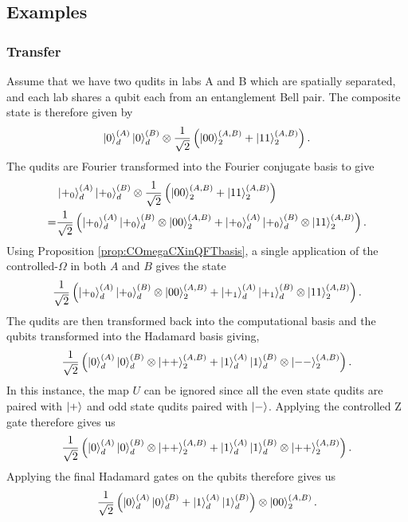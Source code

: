 \subsection{Examples}
\label{subsection:examples}
\subsubsection{Transfer}
\label{subsubsection:aqcstorage}
Assume that we have two qudits in labs A and B which are spatially separated, and each lab shares a qubit each from an entanglement Bell pair. The composite state is therefore given by
\begin{equation}
    \ket{0}^{(A)}_d\ket{0}^{(B)}_d\otimes\frac{1}{\sqrt{2}}\left(\ket{00}_2^{(A,B)} + \ket{11}_2^{(A,B)}\right).
\end{equation}
The qudits are Fourier transformed into the Fourier conjugate basis to give
\begin{align}
    &\ket{+_0}^{(A)}_d\ket{+_0}^{(B)}_d\otimes\frac{1}{\sqrt{2}}\left(\ket{00}_2^{(A,B)} + \ket{11}_2^{(A,B)}\right)\\
    =&\frac{1}{\sqrt{2}}\left(
        \ket{+_0}^{(A)}_d\ket{+_0}^{(B)}_d \otimes \ket{00}_2^{(A,B)}
        +\ket{+_0}^{(A)}_d\ket{+_0}^{(B)}_d \otimes \ket{11}_2^{(A,B)}
        \right).
\end{align}
Using Proposition \ref{prop:COmegaCXinQFTbasis}, a single application of the controlled-$\Omega$ in both $A$ and $B$ gives the state
\begin{equation}
    \frac{1}{\sqrt{2}}\left(
        \ket{+_0}^{(A)}_d\ket{+_0}^{(B)}_d \otimes \ket{00}_2^{(A,B)}
        +\ket{+_1}^{(A)}_d\ket{+_1}^{(B)}_d \otimes \ket{11}_2^{(A,B)}
        \right).
\end{equation}
The qudits are then transformed back into the computational basis and the qubits transformed into the Hadamard basis giving,
\begin{equation}
    \frac{1}{\sqrt{2}}\left(
        \ket{0}^{(A)}_d\ket{0}^{(B)}_d \otimes \ket{++}_2^{(A,B)}
        +\ket{1}^{(A)}_d\ket{1}^{(B)}_d \otimes \ket{--}_2^{(A,B)}
        \right).
\end{equation}
In this instance, the map $U$ can be ignored since all the even state qudits are paired with $\ket{+}$ and odd state qudits paired with $\ket{-}$. Applying the controlled Z gate therefore gives us
\begin{equation}
    \frac{1}{\sqrt{2}}\left(
        \ket{0}^{(A)}_d\ket{0}^{(B)}_d \otimes \ket{++}_2^{(A,B)}
        +\ket{1}^{(A)}_d\ket{1}^{(B)}_d \otimes \ket{++}_2^{(A,B)}
        \right).
\end{equation}
Applying the final Hadamard gates on the qubits therefore gives us
\begin{equation}
    \label{eq:singletransferfinalstate}
    \frac{1}{\sqrt{2}}\left(
        \ket{0}^{(A)}_d\ket{0}^{(B)}_d +\ket{1}^{(A)}_d\ket{1}^{(B)}_d\right) \otimes \ket{00}_2^{(A,B)}.
\end{equation}

